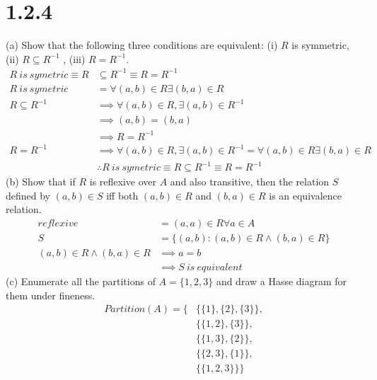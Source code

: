 \documentclass{article}
\begin{document}
\section*{1.2.4}
(a) Show that the following three conditions are equivalent: (i) $R$ is symmetric, (ii) $R \subseteq R^{-1}$ , (iii) $R = R^{-1}$.
\begin{align*}
    R\ is\ symetric \equiv R &\subseteq R^{-1} \equiv R = R^{-1}\\
    R\ is\ symetric &= \forall(a,b) \in R \exists (b,a) \in R\\
    R \subseteq R^{-1} &\implies \forall (a,b) \in R, \exists (a, b) \in R^{-1}\\
    &\implies (a,b) = (b, a)\\
    &\implies R = R^{-1}\\
    R = R^{-1}&\implies \forall (a,b) \in R, \exists (a, b) \in R^{-1}= \forall(a,b) \in R \exists (b,a) \in R\\
    &\therefore R\ is\ symetric \equiv R \subseteq R^{-1} \equiv R = R^{-1}
\end{align*}
(b) Show that if $R$ is reflexive over $A$ and also transitive, then the relation $S$ defined by $(a,b) \in S$ iff both $(a,b) \in R$ and $(b,a) \in R$ is an equivalence relation.
\begin{align*}
    reflexive &= (a, a) \in R \forall a \in A \\
    S &= \{(a, b):(a,b) \in R \wedge (b,a) \in R \}\\
    (a,b) \in R \wedge (b,a) \in R &\implies a = b\\
    &\implies S\ is\ equivalent
\end{align*}
(c) Enumerate all the partitions of $A=\{ 1, 2, 3 \}$ and draw a Hasse diagram for them under fineness.
\begin{align*}
    Partition(A) =\{&\{\{1\}, \{2\}, \{3\}\},\\
    &\{\{1, 2\},\{3\}\},\\
    &\{\{1, 3\},\{2\}\},\\
    &\{\{2, 3\},\{1\}\},\\
    &\{\{1, 2, 3\}\}\}
\end{align*}
\begin{center}
\end{center}
\end{document}
